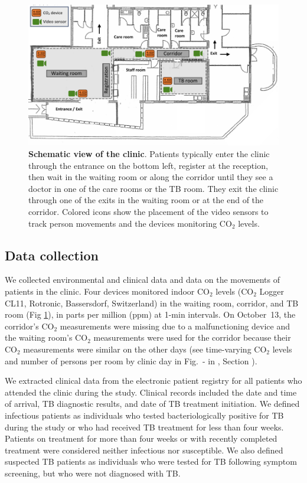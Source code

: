 \documentclass[fleqn,11pt]{wlscirep}
\begin{document}
\begin{figure}[!htpb]
    \centering
    \includegraphics{doc/clinic-schematic-annotated-view.pdf}
    \caption{\textbf{Schematic view of the clinic}. Patients typically enter the clinic through the entrance on the bottom left, register at the reception, then wait in the waiting room or along the corridor until they see a doctor in one of the care rooms or the TB room. They exit the clinic through one of the exits in the waiting room or at the end of the corridor. Colored icons show the placement of the video sensors to track person movements and the devices monitoring CO$_2$ levels.}
    \label{fig:floor-plan}
\end{figure}


\subsection*{Data collection}

We collected environmental and clinical data and data on the movements of patients in the clinic. Four devices monitored indoor CO$_2$ levels (CO$_2$ Logger CL11, Rotronic, Bassersdorf, Switzerland) in the waiting room, corridor, and TB room (Fig \ref{fig:floor-plan}), in parts per million (ppm) at 1-min intervals. On October~13, the corridor's CO$_2$ measurements were missing due to a malfunctioning device and the waiting room's CO$_2$ measurements were used for the corridor because their CO$_2$ measurements were similar on the other days (see time-varying CO$_2$ levels and number of persons per room by clinic day in Fig.~- in \supp, Section ).

We extracted clinical data from the electronic patient registry for all patients who attended the clinic during the study. Clinical records included the date and time of arrival, TB diagnostic results, and date of TB treatment initiation. We defined infectious patients as individuals who tested bacteriologically positive for TB during the study or who had received TB treatment for less than four weeks. Patients on treatment for more than four weeks or with recently completed treatment were considered neither infectious nor susceptible. We also defined suspected TB patients as individuals who were tested for TB following symptom screening, but who were not diagnosed with TB. 
\end{document}

